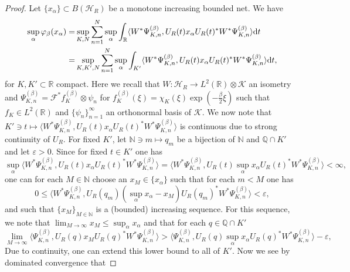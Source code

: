 \documentclass[sn-mathphys-num]{sn-jnl}%
\newcommand{\RR}{\mathbb{R}}
\newcommand{\HH}{\mathcal{H}}
\newcommand{\KK}{\mathcal{K}}
\newcommand{\diff}{\textup{d}}
\numberwithin{equation}{section}
\theoremstyle{thmstyleone}%
\theoremstyle{thmstyletwo}%
\theoremstyle{thmstylethree}%
\begin{document}
\begin{proof}
    Let $\{x_\alpha\}\subset B(\HH_R)$ be a monotone increasing bounded net. We have
    \begin{align}
        \sup_\alpha\varphi_\beta(x_\alpha)=&\sup_{K,N}\sum_{n=1}^N\sup_\alpha\int_\RR \langle W^*\Psi_{K,n}^{(\beta)},U_R(t)x_\alpha U_R(t)^*W^*\Psi_{K,n}^{(\beta)}\rangle\diff t\nonumber\\
        =&\sup_{K,K',N}\sum_{n=1}^N\sup_\alpha\int_{K'} \langle W^*\Psi_{K,n}^{(\beta)},U_R(t)x_\alpha U_R(t)^*W^*\Psi_{K,n}^{(\beta)}\rangle\diff t,
    \end{align}
    for $K,K'\subset\RR$ compact. Here we recall that $W:\HH_R\to L^2(\RR)\otimes \KK$ an isometry and $\Psi^{(\beta)}_{K,n}=\mathcal{F}^*f_{K}^{(\beta)}\otimes \psi_n$ for $f_{K}^{(\beta)}(\xi)=\chi_K(\xi)\exp(-\frac{\beta}{2}\xi)$ such that $f_K\in L^2(\RR)$ and $\{\psi_n\}_{n=1}^\infty$ an orthonormal basis of $\KK$. We now note that $K'\ni t\mapsto \langle W^*\Psi_{K,n}^{(\beta)},U_R(t)x_\alpha U_R(t)^*W^*\Psi_{K,n}^{(\beta)}\rangle$ is continuous due to strong continuity of $U_R$. For fixed $K'$, let $\mathbb{N}\ni m\mapsto q_m$ be a bijection of $\mathbb{N}$ and $\mathbb{Q}\cap K'$ and let $\varepsilon>0$. Since for fixed $t\in K'$ one has 
    \begin{equation}
        \sup_\alpha\langle W^*\Psi_{K,n}^{(\beta)},U_R(t)x_\alpha U_R(t)^*W^*\Psi_{K,n}^{(\beta)}\rangle=\langle W^*\Psi_{K,n}^{(\beta)},U_R(t)\sup_\alpha x_\alpha U_R(t)^*W^*\Psi_{K,n}^{(\beta)}\rangle<\infty,
    \end{equation}
    one can for each $M\in\mathbb{N}$ choose an $x_M\in\{x_\alpha\}$ such that for each $m<M$ one has
    \begin{equation}
         0\leq \langle W^*\Psi_{K,n}^{(\beta)},U_R(q_m)(\sup_\alpha x_\alpha-x_M) U_R(q_m)^*W^*\Psi_{K,n}^{(\beta)}\rangle<\varepsilon,
    \end{equation}
    and such that $\{x_M\}_{M\in\mathbb{N}}$ is a (bounded) increasing sequence. For this sequence, we note that $\lim_{M\to\infty} x_M\leq \sup_\alpha x_\alpha$ and that for each $q\in\mathbb{Q}\cap K'$
    \begin{equation}
        \lim_{M\to\infty}\langle\Psi_{K,n}^{(\beta)},U_R(q)x_M U_R(q)^*W^*\Psi_{K,n}^{(\beta)}\rangle>\langle\Psi_{K,n}^{(\beta)},U_R(q)\sup_\alpha x_\alpha U_R(q)^*W^*\Psi_{K,n}^{(\beta)}\rangle-\varepsilon,
    \end{equation}
    Due to continuity, one can extend this lower bound to all of $K'$. Now we see by dominated convergence that 

\end{proof}
\end{document}
